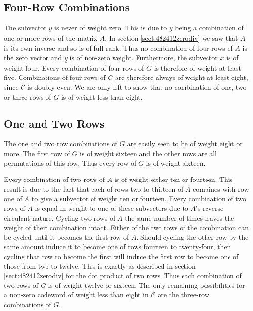 \subsection{Four-Row Combinations}
The subvector $\underline{y}$ is never of weight zero.
This is due to $\underline{y}$ being a combination of one or more rows of the matrix $A$.
In section \ref{sect:482412zerodiv} we saw that $A$ is its own inverse and so is of full rank.
Thus no combination of four rows of $A$ is the zero vector and $\underline{y}$ is of non-zero weight.
Furthermore, the subvector $\underline{x}$ is of weight four.
Every combination of four rows of $G$ is therefore of weight at least five. 
Combinations of four rows of $G$ are therefore always of weight at least eight, since $\mathcal{C}$ is doubly even.
We are only left to show that no combination of one, two or three rows of $G$ is of weight less than eight.

\subsection{One and Two Rows}
\label{sect:48onetworows}
The one and two row combinations of $G$ are easily seen to be of weight eight or more.
The first row of $G$ is of weight sixteen and the other rows are all permutations of this row.
Thus every row of $G$ is of weight sixteen.

Every combination of two rows of $A$ is of weight either ten or fourteen.
This result is due to the fact that each of rows two to thirteen of $A$ combines with row one of $A$ to give a subvector of weight ten or fourteen.
Every combination of two rows of $A$ is equal in weight to one of these subvectors due to $A$'s reverse circulant nature.
Cycling two rows of $A$ the same number of times leaves the weight of their combination intact.
Either of the two rows of the combination can be cycled until it becomes the first row of $A$.
Should cycling the other row by the same amount induce it to become one of rows fourteen to twenty-four, then cycling that row to become the first will induce the first row to become one of those from two to twelve.
This is exactly as described in section \ref{sect:482412zerodiv} for the dot product of two rows.
Thus each combination of two rows of $G$ is of weight twelve or sixteen.
The only remaining possibilities for a non-zero codeword of weight less than eight in $\mathcal{C}$ are the three-row combinations of $G$.

